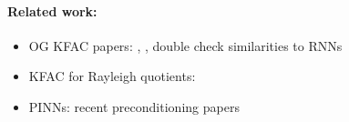 \paragraph{Related work:}
\begin{itemize}
\item OG KFAC papers: \cite{martens2015optimizing}, \cite{martens2018kroneckerfactored}, double check similarities to RNNs
\item KFAC for Rayleigh quotients:
\item PINNs: recent preconditioning papers
\end{itemize}


